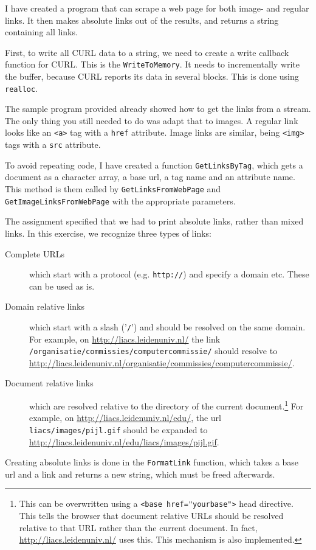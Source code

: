 \documentclass[12pt,a4paper]{article}
\begin{document}
I have created a program that can scrape a web page for both image- and regular links. It then makes absolute links out of the results, and returns a string containing all links.

First, to write all CURL data to a string, we need to create a write callback function for CURL. This is the \texttt{WriteToMemory}. It needs to incrementally write the buffer, because CURL reports its data in several blocks. This is done using \texttt{realloc}.

The sample program provided already showed how to get the links from a stream. The only thing you still needed to do was adapt that to images. A regular link looks like an \texttt{<a>} tag with a \texttt{href} attribute. Image links are similar, being \texttt{<img>} tags with a \texttt{src} attribute.

To avoid repeating code, I have created a function \texttt{GetLinksByTag}, which gets a document as a character array, a base url, a tag name and an attribute name. This method is them called by \texttt{GetLinksFromWebPage} and \texttt{GetImageLinksFromWebPage} with the appropriate parameters.

The assignment specified that we had to print absolute links, rather than mixed links. In this exercise, we recognize three types of links:
\begin{description}
\item[Complete URLs] which start with a protocol (e.g. \texttt{http://}) and specify a domain etc. These can be used as is.

\item[Domain relative links] which start with a slash ('\texttt{/}') and should be resolved on the same domain. For example, on \url{http://liacs.leidenuniv.nl/} the link \\ \texttt{/organisatie/commissies/computercommissie/} should resolve to  \url{http://liacs.leidenuniv.nl/organisatie/commissies/computercommissie/}.

\item[Document relative links] which are resolved relative to the directory of the current document.\footnote{This can be overwritten using a \texttt{<base href="yourbase">} head directive. This tells the browser that document relative URLs should be resolved relative to that URL rather than the current document. In fact, \url{http://liacs.leidenuniv.nl/} uses this. This mechanism is also implemented.} For example, on \url{http://liacs.leidenuniv.nl/edu/}, the url \texttt{liacs/images/pijl.gif} should be expanded to \url{http://liacs.leidenuniv.nl/edu/liacs/images/pijl.gif}.
\end{description}
Creating absolute links is done in the \texttt{FormatLink} function, which takes a base url and a link and returns a new string, which must be freed afterwards.
\end{document}
